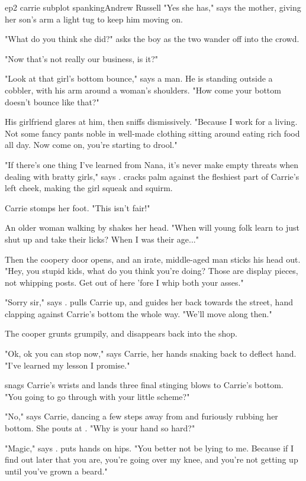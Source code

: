 \documentclass{book}
\begin{document}
\begin{childnode}{ep2 carrie subplot spanking}{Andrew Russell}
    "Yes she has," says the mother, giving her son's arm a light tug to keep him moving on.

    "What do you think she did?" asks the boy as the two wander off into the crowd.

    "Now that's not really our business, is it?"

    "Look at that girl's bottom bounce," says a man. He is standing outside a cobbler, with his arm around a woman's shoulders. "How come your bottom doesn't bounce like that?"

    His girlfriend glares at him, then sniffs dismissively. "Because I work for a living. Not some fancy pants noble in well-made clothing sitting around eating rich food all day. Now come on,
    you're starting to drool."

    "If there's one thing I've learned from Nana, it's never make empty threats when dealing with bratty girls," says \name{}. \HeShe{} cracks \hisher{} palm against the fleshiest part of 
    Carrie's left cheek, making the girl squeak and squirm.

    Carrie stomps her foot. "This isn't fair!"

    An older woman walking by shakes her head. "When will young folk learn to just shut up and take their licks? When I was their age..."

    Then the coopery door opens, and an irate, middle-aged man sticks his head out. "Hey, you stupid kids, what do you think you're doing? Those are display pieces, not whipping posts. Get out 
    of here 'fore I whip both your asses."

    "Sorry sir," says \name{}. \HeShe{} pulls Carrie up, and guides her back towards the street, \hisher{} hand clapping against Carrie's bottom the whole way. "We'll move along then." 

    The cooper grunts grumpily, and disappears back into the shop.

    "Ok, ok you can stop now," says Carrie, her hands snaking back to deflect \names{} hand. "I've learned my lesson I promise."

    \name{} snags Carrie's wrists and lands three final stinging blows to Carrie's bottom. "You going to go through with your little scheme?"

    "No," says Carrie, dancing a few steps away from \name{} and furiously rubbing her bottom. She pouts at \name{}. "Why is your hand so hard?"

    "Magic," says \name{}. \HeShe{} puts \hisher{} hands on \hisher{} hips. "You better not be lying to me. Because if I find out later that you are, you're going over my knee, and you're not
    getting up until you've grown a beard."


\end{childnode}
\end{document}
